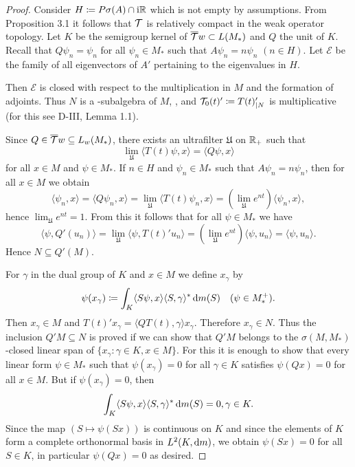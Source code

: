 \begin{proof}
Consider $H \coloneqq P\sigma(A) \cap \mathrm{i}\mathbb{R}$ which is not empty by assumptions.
From Proposition 3.1 it follows that $\mathcal{T}$ is relatively compact in the weak operator topology.
Let $K$ be the semigroup kernel of $\overline{\mathcal{T}}{w} \subset L(M_{*})$ and $Q$ the unit of $K$.
Recall that $Q\psi_{n} = \psi_{n}$ for all $\psi_{n} \in M_{*}$ such that $A\psi_{n} = n\psi_{n}$ $(n \in H)$.
Let $\mathcal{E}$ be the family of all eigenvectors of $A'$ pertaining to the eigenvalues in $H$.

Then $\mathcal{E}$ is closed with respect to the multiplication in $M$ and the formation of adjoints.
Thus $N$ is a \WA-subalgebra of $M$, \citet[Corollary 1.7.9.]{sakai:1971}, and $\mathcal{T}_{0}(t)' \coloneqq T(t)'_{|N}$ is multiplicative (for this see D-III, Lemma 1.1).

Since $Q \in \overline{\mathcal{T}}{w}  \subseteq L_{w}(M_{*})$, there exists an ultrafilter $\mathfrak{U}$ on $\mathbb{R}_{+}$ such that 
%
\[
	\lim_{\mathfrak{U}}\langle T(t)\psi,x\rangle = \langle Q\psi,x\rangle
\]
%
for all $x \in M$ and $\psi \in M_{*}$.
If $n \in H$ and $\psi_{n} \in M_{*}$ such that $A\psi_{n} = n\psi_{n}$, then for all $x \in M$ we obtain
\[
\langle\psi_{n},x\rangle = \langle Q\psi_{n},x\rangle = \lim_{\mathfrak{U}} \langle T(t)\psi_{n},x\rangle = (\lim_{\mathfrak{U}} e^{nt})\langle\psi_{n},x\rangle,
\]
hence $\lim_{\mathfrak{U}} e^{nt} = 1$.
From this it follows that for all $\psi \in M_{*}$ we have
\[
\langle\psi,Q'(u_{n})\rangle = \lim_{\mathfrak{U}} \langle\psi,T(t)'u_{n}\rangle = (\lim_{\mathfrak{U}} e^{nt})\langle\psi,u_{n}\rangle = \langle\psi,u_{n}\rangle.
\]
Hence $N \subseteq Q'(M)$.

For $\gamma$ in the dual group of $K$ and $x \in M$ we define $x_{\gamma}$ by
\[
\psi(x_{\gamma}) \coloneqq \int_{K} \langle S\psi,x\rangle\langle S,\gamma\rangle^{*} \mathop{}\!\mathrm{d}{m} (S) \quad (\psi \in M_{*}^{+}).
\]
Then $x_{\gamma} \in M$ and $T(t)'x_{\gamma} = \langle QT(t),\gamma\rangle x_{\gamma}$.
Therefore $x_{\gamma} \in N$.
Thus the inclusion $Q'M \subseteq N$ is proved if we can show that $Q'M$ belongs to the $\sigma(M,M_{*})$-closed linear span of $\{x_{\gamma} \colon \gamma \in K, x \in M\}$.
For this it is enough to show that every linear form $\psi \in M_{*}$ such that $\psi(x_{\gamma}) = 0$ for all $\gamma \in K$ satisfies $\psi(Qx) = 0$ for all $x \in M$.
But if $\psi(x_{\gamma}) = 0$, then
\[
\int_{K} \langle S\psi,x\rangle\langle S,\gamma\rangle^{*} \mathop{}\!\mathrm{d}{m} (S) = 0, \gamma \in K.
\]
Since the map $(S \mapsto \psi(Sx))$ is continuous on $K$ and since the elements of $K$ form a complete orthonormal basis in $L^2(K,\mathop{}\!\mathrm{d}{m})$, we obtain $\psi(Sx) = 0$ for all $S \in K$, in particular $\psi(Qx) = 0$ as desired.


\end{proof}
